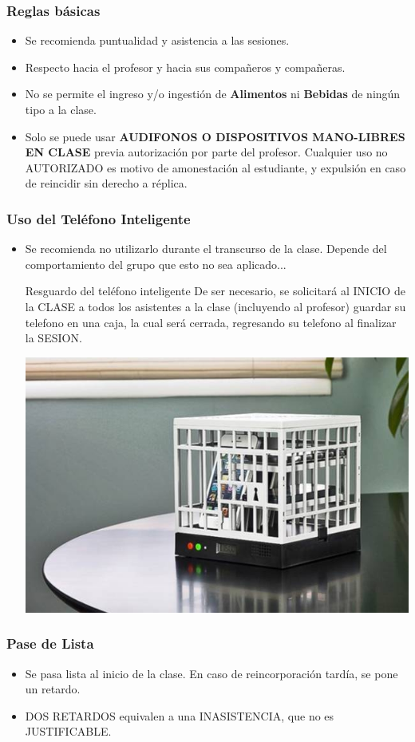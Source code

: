 
\begin{frame}
\frametitle{Reglas básicas}
\begin{itemize}
\item Se recomienda puntualidad y asistencia a las sesiones.
\item Respecto hacia el profesor y hacia sus compañeros y compañeras.  
\item No se permite el ingreso y/o ingestión de \textbf{Alimentos} ni \textbf{Bebidas} de ningún tipo a la clase. 
\item Solo se puede usar \textbf{AUDIFONOS O DISPOSITIVOS MANO-LIBRES EN CLASE} previa autorización por parte del profesor. Cualquier uso no AUTORIZADO es motivo de amonestación  al estudiante, y expulsión en caso de reincidir sin derecho a r\'eplica. 
\end{itemize}
\end{frame}

\begin{frame}
\frametitle{Uso del Teléfono Inteligente}
\begin{itemize}
\item Se recomienda no utilizarlo durante el transcurso de la clase. Depende del comportamiento del grupo que esto no sea aplicado...
\begin{block}{Resguardo del teléfono inteligente}
De ser necesario, se solicitará al INICIO de la CLASE a todos los asistentes a la clase (incluyendo al profesor) guardar su telefono en una caja, la cual será cerrada, regresando su telefono al finalizar la SESION.
\begin{center}
\includegraphics[width=0.35\linewidth]{ReglasBasicas/CajaFuerteCeluar.jpg}
\end{center}
\end{block}
\end{itemize}
\end{frame}

\begin{frame}
\frametitle{Pase de Lista}
\begin{itemize}
\item Se pasa lista al inicio de la clase. En caso de reincorporaci\'on tard\'ia, se pone un retardo.
\item DOS RETARDOS equivalen a una INASISTENCIA, que no es JUSTIFICABLE.
\end{itemize}
\end{frame}


